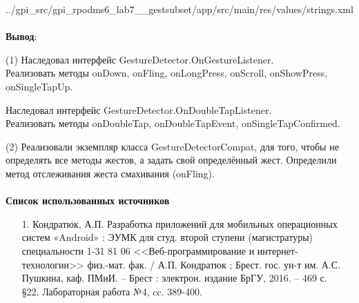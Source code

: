 \documentclass[12pt, a4paper, simple]{eskdtext}
\begin{document}
    
        {../gpi_src/gpi_rpodms6_lab7__gestsubset/app/src/main/res/values/strings.xml}

    \paragraph{} \textbf{Вывод}:
    
    (1) Наследовал интерфейс GestureDetector.OnGestureListener.\\
    Реализовать методы onDown, onFling, onLongPress, onScroll, onShowPress, onSingleTapUp.
    
    Наследовал интерфейс GestureDetector.OnDoubleTapListener.\\
    Реализовать методы onDoubleTap, onDoubleTapEvent, onSingleTapConfirmed.

    (2) Реализовали экземпляр класса GestureDetectorCompat, для того, чтобы не определять все методы жестов,
    а задать свой определённый жест. Определили метод отслеживания жеста смахивания (onFling). 

    \paragraph{} \textbf{Список использованных источников} 
    \begin{enumerate}
        \item[1.] Кондратюк, А.П. Разработка приложений для мобильных операционных систем «Android» :
        ЭУМК для студ. второй ступени (магистратуры) специальности 1-31 81 06 <<Веб-программирование и интернет-технологии>>
        физ.-мат. фак. / А.П. Кондратюк ; Брест. гос. ун-т им. А.С. Пушкина, каф. ПМиИ. – Брест :
        электрон. издание БрГУ, 2016. – 469 с.\\
        §22. Лабораторная работа №4, cc. 389-400.
    \end{enumerate}
    \newpage
\end{document}
